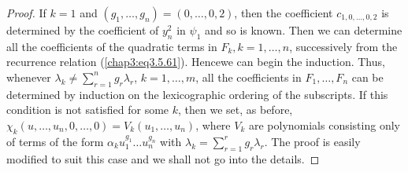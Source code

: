 \begin{proof}
If $k=1$ and $(g_1, \ldots, g_n) = (0, \ldots, 0,2)$, then the
coefficient $c_{1, 0,\ldots, 0,2}$ is determined by the coefficient of
$y^2_n$ in $\psi_1$ and so is known. Then we can determine all the
coefficients of the quadratic terms in $F_k, k =1, \ldots, n$,
successively from the recurrence relation (\ref{chap3:eq3.5.61}). 
Hence\pageoriginale we can begin the induction. Thus, whenever
$\lambda_k\neq \sum\limits^n_{r=1} g_r \lambda_r$, $k=1, \ldots, m$,
all the coefficients in $F_1, \ldots, F_n$ can be determined by
induction on the lexicographic ordering of the subscripts. If this
condition is not satisfied for some $k$, then we set, as before, 
$\chi_k(u,\ldots, u_n, 0, \ldots, 0) =V_k(u_1, \ldots,u_n)$, where
$V_k$ are polynomials consisting only of terms of the form $\alpha_k
u^{g_1}_1 \ldots u^{g_n}_n$ with $\lambda_k = \sum\limits^r_{r=1} g_r
\lambda_r$. The proof is easily modified to suit this case and we
shall not go into the details. 


\end{proof}
